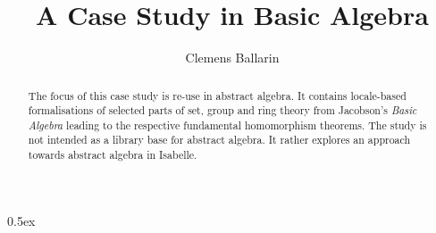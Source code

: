 \documentclass{article}
\begin{document}
\title{A Case Study in Basic Algebra}
\author{Clemens Ballarin}
\date{}

\maketitle

\begin{abstract}
  The focus of this case study is re-use in abstract algebra.  It contains
  locale-based formalisations of selected parts of set, group and ring
  theory from Jacobson's \emph{Basic Algebra} leading to the
  respective fundamental homomorphism theorems.  The study is not
  intended as a library base for abstract algebra.  It rather explores
  an approach towards abstract algebra in Isabelle.
\end{abstract}

\parindent 0pt\parskip 0.5ex

\pagestyle{plain}




\end{document}
